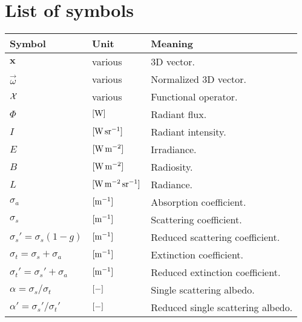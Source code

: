 \chapter*{List of symbols}
\label{sec:symbols}

\begin{tabular*}{\textwidth}{p{}p{}p{}}
\hline
\rowcolor{alexblue!50}
\textbf{Symbol} & \textbf{Unit} & \textbf{Meaning} \\ \hline
$\mathbf{x}$ & various & 3D vector. \\
$\vec{\omega}$ & various & Normalized 3D vector. \\
$\mathcal{X}$ & various & Functional operator. \\
$\Phi$ & $[\SI{}{W}]$ & Radiant flux. \\                                      
$I$ & $\siunitnospace{\watt \per \steradian}$ & Radiant intensity. \\                                      
$E$ & $[\SI{}{\watt \per \square \metre}]$ & Irradiance. \\                                      
$B$ & $[\SI{}{\watt \per \square \metre }]$ & Radiosity. \\                                      
$L$ & $\siunitnospace{\watt \per \square \metre \per \steradian}$ & Radiance. \\                                      
$\sigma_a$ & $[\SI{}{\per \metre}]$ & Absorption coefficient. \\                                      
$\sigma_s$ & $[\SI{}{\per \metre}]$ & Scattering coefficient. \\                                      
$\sigma_s' = \sigma_s (1-g)$ & $[\SI{}{\per \metre}]$ & Reduced scattering coefficient. \\                                      
$\sigma_t = \sigma_s + \sigma_a$ & $[\SI{}{\per \metre}]$ & Extinction coefficient. \\                                      
$\sigma_t' = \sigma_s' + \sigma_a$ & $[\SI{}{\per \metre}]$ & Reduced extinction coefficient. \\                                      
$\alpha = \sigma_s / \sigma_t $ & $[\SI{}{-}]$ & Single scattering albedo. \\
$\alpha' = \sigma_s' / \sigma_t' $ & $[\SI{}{-}]$ & Reduced single scattering albedo. \\                                      

\end{tabular*}
